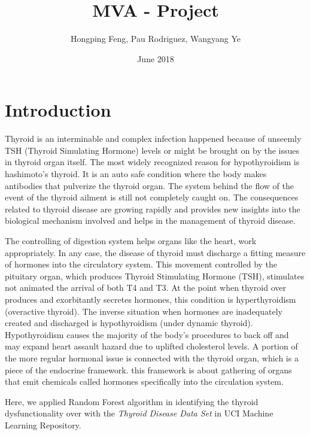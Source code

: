 \documentclass{article}
\title{MVA - Project}
\author{Hongping Feng, Pau Rodriguez, Wangyang Ye }
\date{June 2018}
\begin{document}
\maketitle

\section{Introduction}
Thyroid is an interminable and complex infection happened because of unseemly TSH (Thyroid Simulating Hormone) levels or might be brought on by the issues in thyroid organ itself. The most widely recognized reason for hypothyroidism is hashimoto's thyroid. It is an auto safe condition where the body makes antibodies that pulverize the thyroid organ. The system behind the flow of the event of the thyroid ailment is still not completely caught on. The consequences related to thyroid disease are growing rapidly and provides new insights into the biological mechanism involved and helps in the management of thyroid disease. 

The  controlling  of  digestion  system  helps  organs  like  the heart, work appropriately. In any case, the disease of thyroid  must  discharge  a  fitting  measure  of  hormones  into the circulatory system. This movement controlled by the pituitary organ, which produces Thyroid Stimulating Hormone  (TSH),  stimulates  not  animated  the  arrival  of  both  T4  and  T3.  At the point when  thyroid  over  produces  and  exorbitantly  secretes  hormones, this condition is hyperthyroidism (overactive thyroid).   The   inverse   situation   when   hormones   are   inadequately  created  and  discharged  is  hypothyroidism  (under  dynamic  thyroid).  Hypothyroidism  causes  the  majority  of  the  body’s  procedures  to  back  off  and  may  expand  heart  assault  hazard  due  to  uplifted  cholesterol  levels.  A  portion  of  the  more  regular  hormonal  issue  is  connected with the thyroid organ, which is a piece of the endocrine framework. this framework is about gathering of  organs  that  emit  chemicals  called  hormones  specifically into the circulation system. 

Here, we applied Random Forest algorithm in identifying the thyroid dysfunctionality over with the \textit{Thyroid Disease Data Set} in UCI Machine Learning Repository. 
\end{document}
